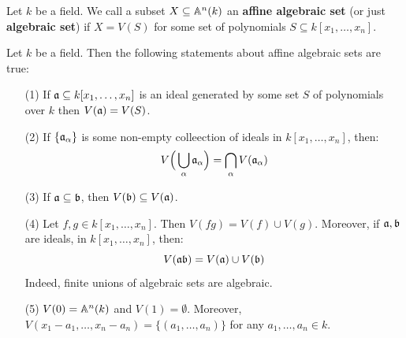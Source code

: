 \begin{definition}
  Let $k$ be a field. We call a subset  $X \subseteq \mathbb{A}^n(k)$ an
  \textbf{affine algebraic set} (or just \textbf{algebraic set}) if
  $X=V(S)$ for some set of polynomials $S \subseteq k[x_1, \dots,
  x_n]$.
\end{definition}

\begin{proposition}\label{proposition_10.1.2}
  Let $k$ be a field. Then the following statements about affine
  algebraic sets are true:
  \begin{enumerate}
    \item[(1)] If $\mathfrak{a} \subseteq k[x_1, \dots, x_n]$ is an ideal
      generated by some set $S$ of polynomials over $k$ then
      $V(\mathfrak{a})=V(S)$.

    \item[(2)] If $\{\mathfrak{a}_\alpha\}$ is some non-empty colleection of ideals
      in $k[x_1, \dots, x_n]$, then:
      \begin{equation*}
        V\Big{(} \bigcup_{\alpha}{\mathfrak{a}_\alpha} \Big{)}=\bigcap_{\alpha}{V(\mathfrak{a}_\alpha)}
      \end{equation*}

    \item[(3)] If $\mathfrak{a} \subseteq \mathfrak{b}$, then $V(\mathfrak{b}) \subseteq V(\mathfrak{a})$.

    \item[(4)] Let $f,g \in k[x_1, \dots, x_n]$. Then $V(fg)=V(f) \cup
      V(g)$. Moreover, if $\mathfrak{a}, \mathfrak{b} $ are ideals, in $k[x_1, \dots,
      x_n]$, then:
      \begin{equation*}
        V(\mathfrak{a}\mathfrak{b})=V(\mathfrak{a}) \cup V(\mathfrak{b})
      \end{equation*}
      Indeed, finite unions of algebraic sets are algebraic.

    \item[(5)] $V(0)=\mathbb{A}^n(k)$ and $V(1)=\emptyset$. Moreover,
      $V(x_1-a_1, \dots, x_n-a_n)=\{(a_1, \dots, a_n)\}$ for any $a_1,
      \dots, a_n \in k$.
  \end{enumerate}
\end{proposition}
